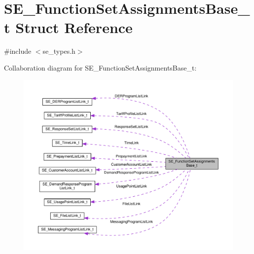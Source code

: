 \hypertarget{structSE__FunctionSetAssignmentsBase__t}{}\section{S\+E\+\_\+\+Function\+Set\+Assignments\+Base\+\_\+t Struct Reference}
\label{structSE__FunctionSetAssignmentsBase__t}


{\ttfamily \#include $<$se\+\_\+types.\+h$>$}



Collaboration diagram for S\+E\+\_\+\+Function\+Set\+Assignments\+Base\+\_\+t\+:\nopagebreak
\begin{figure}[H]
\begin{center}
\leavevmode
\includegraphics[width=350pt]{structSE__FunctionSetAssignmentsBase__t__coll__graph}
\end{center}
\end{figure}
